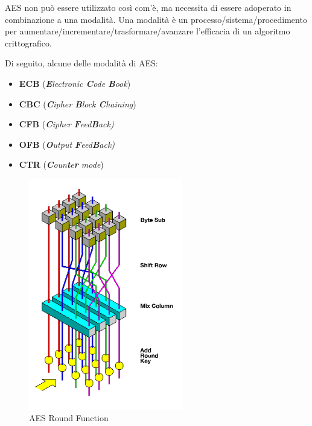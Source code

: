 \textsf{\small AES non può essere utilizzato così com'è, ma necessita di essere adoperato in combinazione a una modalità. } %
\textsf{\small Una modalità è un processo/sistema/procedimento per aumentare/incrementare/trasformare/avanzare l'efficacia di un algoritmo crittografico.  } %

\textsf{\small Di seguito, alcune delle modalità di AES: }

\begin{itemize} %
	\item \textsf{\small \textbf{ECB} (\emph{\textbf{E}lectronic \textbf{C}ode \textbf{B}ook})}
	\item \textsf{\small \textbf{CBC} (\emph{\textbf{C}ipher \textbf{B}lock \textbf{C}haining})}
	\item \textsf{\small \textbf{CFB} (\emph{\textbf{C}ipher \textbf{F}eed\textbf{B}ack)}}
	\item \textsf{\small \textbf{OFB} (\emph{\textbf{O}utput \textbf{F}eed\textbf{B}ack)}}
	\item \textsf{\small \textbf{CTR} (\emph{\textbf{C}oun\textbf{t}e\textbf{r} mode})}
\end{itemize} 


\newpage

\begin{figure}[H] %
	\centering
	\includegraphics[width=0.6\textwidth, height=0.6\textheight, keepaspectratio]{./images/aes/500px-AES_(Rijndael)_Round_Function.png}
	\caption{AES Round Function}
	\label{fig:500px-AES_(Rijndael)_Round_Function}
\end{figure}


